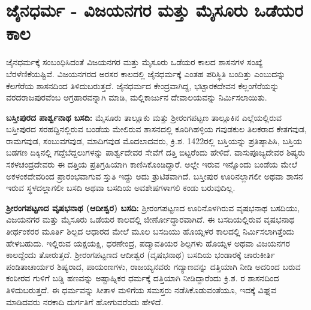 \section*{ಜೈನಧರ್ಮ - ವಿಜಯನಗರ ಮತ್ತು ಮೈಸೂರು ಒಡೆಯರ ಕಾಲ}

ಜೈನಧರ್ಮಕ್ಕೆ ಸಂಬಂಧಿಸಿದಂತೆ ವಿಜಯನಗರ ಮತ್ತು ಮೈಸೂರು ಒಡೆಯರ ಕಾಲದ ಶಾಸನಗಳ ಸಂಖ್ಯೆ ಬೆರಳೆಣಿಕೆಯಷ್ಟಿವೆ. ವಿಜಯನಗರದ ಅರಸರ ಕಾಲದಲ್ಲಿ ಜೈನಧರ್ಮಕ್ಕೆ ಎಂತಹ ಪರಿಸ್ಥಿತಿ ಬಂದಿತ್ತು ಎಂಬುದನ್ನು ಕೆಲಗೆರೆಯ ಶಾಸನದಿಂದ ತಿಳಿದುಬರುತ್ತದೆ. ಜೈನಧರ್ಮದ ಕೇಂದ್ರವಾಗಿದ್ದ, ಭಟ್ಟಾರಕದೇವನ ಕೆಲ್ಲಂಗೆರೆಯನ್ನು ವರದರಾಜಪುರವೆಂಬ ಅಗ್ರಹಾರವನ್ನಾಗಿ ಮಾಡಿ, ಮಲ್ಲಿಕಾರ್ಜುನ ದೇವಾಲಯವನ್ನು ನಿರ್ಮಿಸಲಾಯಿತು.

\textbf{ಬಸ್ತೀಪುರದ ಪಾರ್ಶ್ವನಾಥ ಬಸದಿ:} ಮೈಸೂರು ತಾಲ್ಲೂಕು ಮತ್ತು ಶ‍್ರೀರಂಗಪಟ್ಟಣ ತಾಲ್ಲೂಕಿನ ಎಲ್ಲೆಯಲ್ಲಿರುವ ಬಸ್ತೀಪುರದ ಸರಹದ್ದಿನಲ್ಲಿರುವ ಬಂಡೆಯ ಮೇಲಿರುವ ಶಾಸನದಲ್ಲಿ ಕೂರಿಗಿಹಳ್ಳಿಯ ಗವುಡಕುಲ ತಿಲಕರಾದ ಕೇತಗವುಡ, ರಾಮಗವುಡ, ಸಂಬುವಗವುಡ, ಮಾದಿಗವುಡ ಮೊದಲಾದವರು, ಕ್ರಿ.ಶ. 1422ರಲ್ಲಿ ಬಸ್ತಿಯನ್ನು ಪ್ರತಿಷ್ಠಾಪಿಸಿ, ಬಸ್ತಿಯ ಬಡಗಣ ದಿಕ್ಕಿನಲ್ಲಿ ಗದ್ದೆಬೆದ್ದಲುಗಳನ್ನು ಪಾರ್ಶ್ವದೇವರ ಸೇವೆಗೆ ದತ್ತಿ ಬಿಟ್ಟರೆಂದು ಹೇಳಿದೆ. ವಾಸುಪೂಜ್ಯದೇವರ ಶಿಷ್ಯರು ಸಕಳಚಂದ್ರದೇವರು ಈ ದತ್ತಿಯ ಪ್ರತಿಗ್ರಹಿಯಾಗಿ ಕಾಣಿಸಿಕೊಂಡಿ\-ದ್ದಾರೆ. ಅಲ್ಲೇ ಇರುವ ಇನ್ನೊಂದು ಬಂಡೆಯ ಮೇಲೆ ಅಕಳಂಕದೇವರಿಂದ ಪ್ರಾರಂಭವಾಗುವ ಸ್ತುತಿ ಇದ್ದು ಅದು ತ್ರುಟಿತವಾಗಿದೆ. ಬಸ್ತೀಪುರ ಊರಿನಲ್ಲಾಗಲೀ ಅಥವಾ ಶಾಸನ ಇರುವ ಸ್ಥಳದಲ್ಲಾಗಲೀ ಬಸದಿ ಅಥವಾ ಬಸದಿಯ ಅವಶೇಷಗಳಾಗಲಿ ಕಂಡು ಬರುವುದಿಲ್ಲ.

\textbf{ಶ‍್ರೀರಂಗಪಟ್ಟಣದ ವೃಷಭನಾಥ (ಆದೀಶ್ವರ) ಬಸದಿ:} ಶ‍್ರೀರಂಗಪಟ್ಟಣದ ಊರಿನೊಳಗಿರುವ ವೃಷಭನಾಥ ಬಸದಿಯು, ವಿಜಯನಗರ ಮತ್ತು ಮೈಸೂರು ಒಡೆಯರ ಕಾಲದಲ್ಲಿ ಜೀರ್ಣೋದ್ಧಾರವಾಗಿದೆ. ಈ ಬಸದಿಯಲ್ಲಿರುವ ವೃಷಭನಾಥ ತೀರ್ಥಂಕರರ ಮೂರ್ತಿ ಶಿಲ್ಪದ ಆಧಾರದ ಮೇಲೆ ಮೂಲ ಬಸದಿಯು ಹೊಯ್ಸಳರ ಕಾಲದಲ್ಲಿ ನಿರ್ಮಿಸಲಾಗಿತ್ತೆಂದು ಹೇಳಬಹುದು. ಇಲ್ಲಿರುವ ಯಕ್ಷಯಕ್ಷಿ, ಧರಣೇಂದ್ರ, ಪದ್ಮಾವತಿಯರ ಶಿಲ್ಪಗಳು ಹೊಯ್ಸಳ ಅಥವಾ ವಿಜಯನಗರ ಕಾಲದ್ದೆಂದು ತೋರುತ್ತದೆ. ಶ‍್ರೀರಂಗಪಟ್ಟಣದ ಆದೀಶ್ವರ (ವೃಷಭನಾಥ) ಬಸದಿಯ ಭಂಡಾರಕ್ಕೆ ಚಾರುಕೀರ್ತಿ ಪಂಡಿತಾ\-ಚಾರ್ಯರ ಶಿಷ್ಯರಾದ, ಪಾಯಂಣಗಳು, ರಾಜಯ್ಯನವರು  ಗದ್ಯಾಣವನ್ನು ದತ್ತಿಯಾಗಿ ನೀಡಿ ಅದರಿಂದ ಬರುವ ಕಂಠೀರವ ಗುಳಿಗೆ  ಬಡ್ಡಿ ಹಣವನ್ನು ಅಷ್ಟಾಹ್ನಿಕರ ಧರ್ಮಕ್ಕೆ ದತ್ತಿಯಾಗಿ ನೀಡಿದ್ದಾರೆಂದು ಕ್ರಿ.ಶ. ರ ಶಾಸನದಿಂದ ತಿಳಿದುಬರುತ್ತದೆ. ಈ ಧರ್ಮವನ್ನು ಸೀತಾಳ ಮಳಿಗೆಯ ಸಮಸ್ತರು ನಡೆಸಿಕೊಡುವಂತೆಯೂ, ಇದಕ್ಕೆ ವಿಘ್ನವ ಮಾಡಿದವರು ನರಕಾದಿ ದುರ್ಗತಿಗೆ ಹೋಗುವರೆಂದು ಹೇಳಿದೆ.

